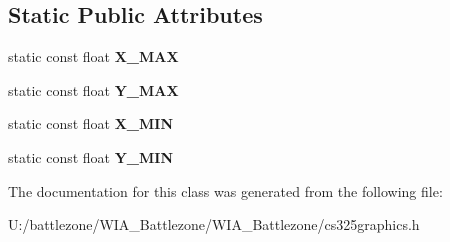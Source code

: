 \subsection*{Static Public Attributes}
\begin{DoxyCompactItemize}
\item 
\hypertarget{class_c_s325_graphics_ad36a4f7cb61ffc2cc6c66da132d63c25}{
static const float {\bfseries X\_\-MAX}}
\label{class_c_s325_graphics_ad36a4f7cb61ffc2cc6c66da132d63c25}

\item 
\hypertarget{class_c_s325_graphics_a4b011e0ec3b09eb067473d8eeb0fda94}{
static const float {\bfseries Y\_\-MAX}}
\label{class_c_s325_graphics_a4b011e0ec3b09eb067473d8eeb0fda94}

\item 
\hypertarget{class_c_s325_graphics_a9b11863e11d057be42bd107ab557360d}{
static const float {\bfseries X\_\-MIN}}
\label{class_c_s325_graphics_a9b11863e11d057be42bd107ab557360d}

\item 
\hypertarget{class_c_s325_graphics_a42ea775ab5872ae0129569f596afda92}{
static const float {\bfseries Y\_\-MIN}}
\label{class_c_s325_graphics_a42ea775ab5872ae0129569f596afda92}

\end{DoxyCompactItemize}


The documentation for this class was generated from the following file:\begin{DoxyCompactItemize}
\item 
U:/battlezone/WIA\_\-Battlezone/WIA\_\-Battlezone/cs325graphics.h\end{DoxyCompactItemize}
